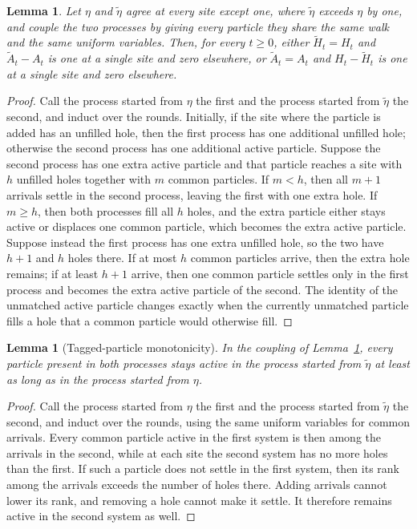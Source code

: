 \documentclass[11pt]{amsart}
\theoremstyle{plain}
\newtheorem{lemma}[theorem]{Lemma}
\theoremstyle{definition}
\begin{document}
\begin{lemma}\label{lem:one-particle}
	Let $\eta$ and $\widetilde\eta$ agree at every site except one, where
	$\widetilde\eta$ exceeds $\eta$ by one, and couple the two processes by
	giving every particle they share the same walk and the same uniform
	variables. Then, for every $t\geq0$, either $\widetilde H_t=H_t$ and
	$\widetilde A_t-A_t$ is one at a single site and zero elsewhere, or
	$\widetilde A_t=A_t$ and $H_t-\widetilde H_t$ is one at a single site and
	zero elsewhere.
\end{lemma}

\begin{proof}
	Call the process started from $\eta$ the first and the process started from
	$\widetilde\eta$ the second, and induct over the rounds. Initially, if the
	site where the particle is added has an unfilled hole, then the first process
	has one additional unfilled hole; otherwise the second process has one
	additional active particle. Suppose the second
	process has one extra active particle and that particle reaches a site with
	$h$ unfilled holes together with $m$ common particles. If $m<h$, then all
	$m+1$ arrivals settle in the second process, leaving the first with one extra
	hole. If $m\geq h$, then both processes fill all $h$ holes, and the extra
	particle either stays active or displaces one common particle, which becomes
	the extra active particle. Suppose instead the first process has one extra
	unfilled hole, so the two have $h+1$ and $h$ holes there. If at most $h$
	common particles arrive, then the extra hole remains; if at least $h+1$
	arrive, then one common particle settles only in the first process and
	becomes the extra active particle of the second. The identity of the unmatched
	active particle changes exactly when the currently unmatched particle fills a
	hole that a common particle would otherwise fill.
\end{proof}

\begin{lemma}[Tagged-particle monotonicity]\label{lem:tagged-monotonicity}
	In the coupling of Lemma~\ref{lem:one-particle}, every particle present in
	both processes
	stays active in the process started from $\widetilde\eta$ at least as long as
	in the process started from $\eta$.
\end{lemma}

\begin{proof}
	Call the process started from $\eta$ the first and the process started from
	$\widetilde\eta$ the second, and induct over the rounds, using the same
	uniform variables for common arrivals. Every
	common particle active in the first system is then among the arrivals in the
	second, while at each site the second system has no more holes than the first.
	If such a
	particle does not settle in the first system, then its rank among the arrivals
	exceeds the number of holes there. Adding arrivals cannot lower its rank, and removing a
	hole cannot make it settle. It therefore remains active in the second system
	as well.
\end{proof}
\end{document}
